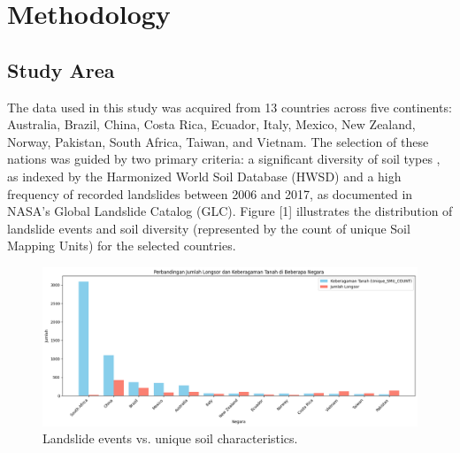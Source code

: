 \section{Methodology}




\subsection{Study Area}
The data used in this study was acquired from 13 countries across five continents: Australia, Brazil, China, Costa Rica, Ecuador, Italy, Mexico, New Zealand, Norway, Pakistan, South Africa, Taiwan, and Vietnam. The selection of these nations was guided by two primary criteria: a significant diversity of soil types , as indexed by the Harmonized World Soil Database (HWSD) and a high frequency of recorded landslides between 2006 and 2017, as documented in NASA’s Global Landslide Catalog (GLC). Figure [1] illustrates the distribution of landslide events and soil diversity (represented by the count of unique Soil Mapping Units) for the selected countries.

\begin{figure}[htbp]
    \centerline{\includegraphics[width=\linewidth]{fig1.png}}
    \caption{Landslide events vs. unique soil characteristics.}
    \label{fig:landslide-soil-distribution}
\end{figure}

